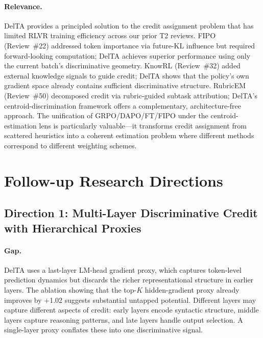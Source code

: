 \documentclass[11pt,a4paper]{article}
\begin{document}
\paragraph{Relevance.}
DelTA provides a principled solution to the credit assignment problem that has limited RLVR training efficiency across our prior T2 reviews. FIPO (Review~\#22) addressed token importance via future-KL influence but required forward-looking computation; DelTA achieves superior performance using only the current batch's discriminative geometry. KnowRL (Review~\#32) added external knowledge signals to guide credit; DelTA shows that the policy's own gradient space already contains sufficient discriminative structure. RubricEM (Review~\#50) decomposed credit via rubric-guided subtask attribution; DelTA's centroid-discrimination framework offers a complementary, architecture-free approach. The unification of GRPO/DAPO/FT/FIPO under the centroid-estimation lens is particularly valuable---it transforms credit assignment from scattered heuristics into a coherent estimation problem where different methods correspond to different weighting schemes.

\section*{Follow-up Research Directions}

\subsection*{Direction 1: Multi-Layer Discriminative Credit with Hierarchical Proxies}

\paragraph{Gap.}
DelTA uses a last-layer LM-head gradient proxy, which captures token-level prediction dynamics but discards the richer representational structure in earlier layers. The ablation showing that the top-$K$ hidden-gradient proxy already improves by +1.02 suggests substantial untapped potential. Different layers may capture different aspects of credit: early layers encode syntactic structure, middle layers capture reasoning patterns, and late layers handle output selection. A single-layer proxy conflates these into one discriminative signal.
\end{document}
